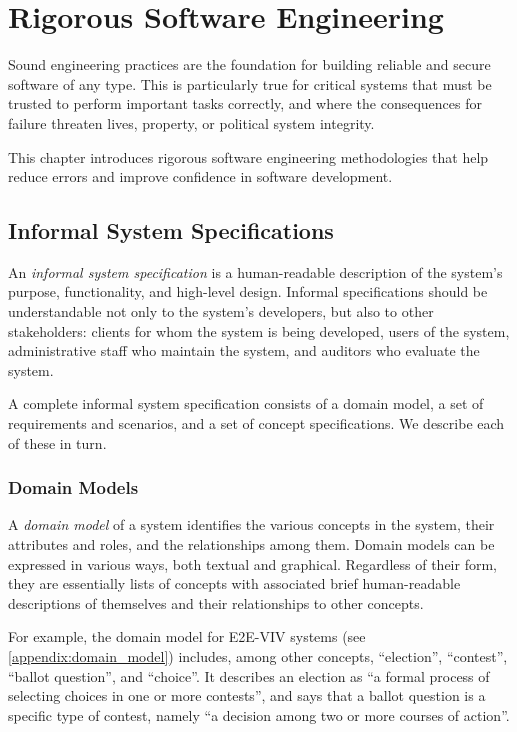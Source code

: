 \chapter{Rigorous Software Engineering}
\label{cha:rigor-softw-engin}

Sound engineering practices are the foundation for building reliable
and secure software of any type. This is particularly true for
critical systems that must be trusted to perform important tasks
correctly, and where the consequences for failure threaten lives,
property, or political system integrity.

This chapter introduces rigorous software engineering methodologies
that help reduce errors and improve confidence in software
development.

\section{Informal System Specifications}

An \emph{informal system specification} is a human-readable
description of the system's purpose, functionality, and high-level
design. Informal specifications should be understandable not only to
the system's developers, but also to other stakeholders: clients for
whom the system is being developed, users of the system,
administrative staff who maintain the system, and auditors who
evaluate the system.

A complete informal system specification consists of a domain model, a
set of requirements and scenarios, and a set of concept
specifications. We describe each of these in turn. 

\subsection{Domain Models}

A \emph{domain model} of a system identifies the various concepts in
the system, their attributes and roles, and the relationships among
them. Domain models can be expressed in various ways, both textual and
graphical. Regardless of their form, they are essentially lists of
concepts with associated brief human-readable descriptions of
themselves and their relationships to other concepts.

For example, the domain model for E2E-VIV systems (see
\autoref{appendix:domain_model}) includes, among other concepts,
``election'', ``contest'', ``ballot question'', and ``choice''. It
describes an election as ``a formal process of selecting choices in
one or more contests'', and says that a ballot question is a specific
type of contest, namely ``a decision among two or more courses of
action''.

